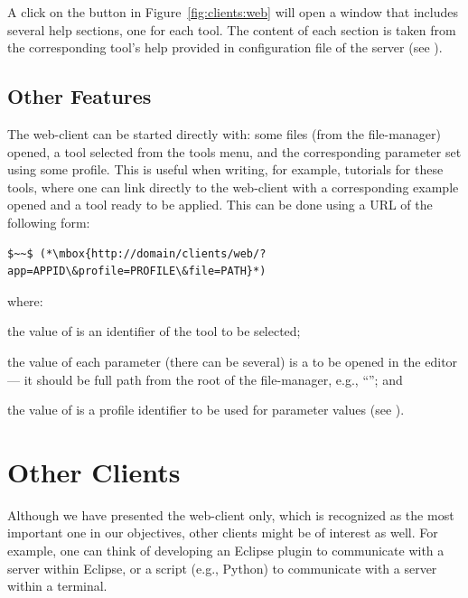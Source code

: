 A click on the \helpbutton button in Figure~\ref{fig:clients:web} will
open a window that includes several help sections, one for each
tool. The content of each section is taken from the corresponding
tool's help provided in configuration file of the \ei server (see
).

\subsection{Other Features}
\label{sec:clients:web:other}

The web-client can be started directly with: some files (from the
file-manager) opened, a tool selected from the tools menu, and the
corresponding parameter set using some profile.
%
This is useful when writing, for example, tutorials for these tools,
where one can link directly to the web-client with a corresponding
example opened and a tool ready to be applied. 
%
This can be done using a URL of the following form:

\medskip
\begin{lstlisting}
$~~$ (*\mbox{http://domain/clients/web/?app=APPID\&profile=PROFILE\&file=PATH}*)
\end{lstlisting}

\medskip
\noindent
where: 
\begin{inparaenum}
%
\item the value of  is an identifier  of
  the tool to be selected;
%
\item the value of each  parameter (there can be
  several) is a  to be opened in the editor --- it should be
  full path from the root of the file-manager, e.g.,
  ``''; and
%
\item the value of  is a profile identifier
   to be used for parameter values (see
  ).
%
\end{inparaenum}
 
\section{Other Clients}
\label{sec:clients:other}

Although we have presented the web-client only, which is recognized as
the most important one in our objectives, other clients might be of
interest as well. For example, one can think of developing an Eclipse
plugin to communicate with a server within Eclipse, or a script
(e.g., Python) to communicate with a server within a terminal.
